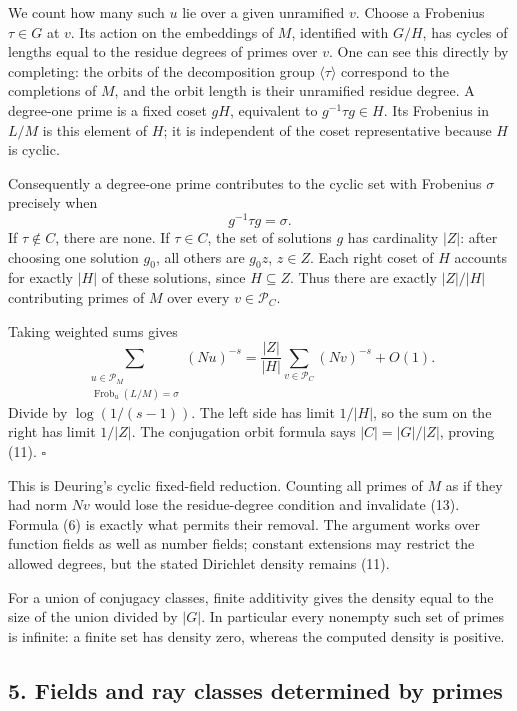 \documentclass[11pt,a4paper]{article}
\begin{document}
We count how many such \(u\) lie over a given unramified \(v\). Choose a
Frobenius \(\tau\in G\) at \(v\). Its action on the embeddings of \(M\),
identified with \(G/H\), has cycles of lengths equal to the residue
degrees of primes over \(v\). One can see this directly by completing:
the orbits of the decomposition group \(\langle\tau\rangle\) correspond
to the completions of \(M\), and the orbit length is their unramified
residue degree. A degree-one prime is a fixed coset \(gH\), equivalent
to \(g^{-1}\tau g\in H\). Its Frobenius in \(L/M\) is this element of
\(H\); it is independent of the coset representative because \(H\) is
cyclic.

Consequently a degree-one prime contributes to the cyclic set with
Frobenius \(\sigma\) precisely when \[
g^{-1}\tau g=\sigma.
\tag{12}
\] If \(\tau\notin C\), there are none. If \(\tau\in C\), the set of
solutions \(g\) has cardinality \(|Z|\): after choosing one solution
\(g_0\), all others are \(g_0z\), \(z\in Z\). Each right coset of \(H\)
accounts for exactly \(|H|\) of these solutions, since \(H\subseteq Z\).
Thus there are exactly \(|Z|/|H|\) contributing primes of \(M\) over
every \(v\in\mathcal P_C\).

Taking weighted sums gives \[
\sum_{\substack{u\in\mathcal P_M\\\operatorname{Frob}_u(L/M)=\sigma}}(Nu)^{-s}
=\frac{|Z|}{|H|}\sum_{v\in\mathcal P_C}(Nv)^{-s}+O(1).
\tag{13}
\] Divide by \(\log(1/(s-1))\). The left side has limit \(1/|H|\), so
the sum on the right has limit \(1/|Z|\). The conjugation orbit formula
says \(|C|=|G|/|Z|\), proving (11). \(\square\)

This is Deuring's cyclic fixed-field reduction. Counting all primes of
\(M\) as if they had norm \(Nv\) would lose the residue-degree condition
and invalidate (13). Formula (6) is exactly what permits their removal.
The argument works over function fields as well as number fields;
constant extensions may restrict the allowed degrees, but the stated
Dirichlet density remains (11).

For a union of conjugacy classes, finite additivity gives the density
equal to the size of the union divided by \(|G|\). In particular every
nonempty such set of primes is infinite: a finite set has density zero,
whereas the computed density is positive.

\subsection{5. Fields and ray classes determined by
primes}\label{fields-and-ray-classes-determined-by-primes}
\end{document}

